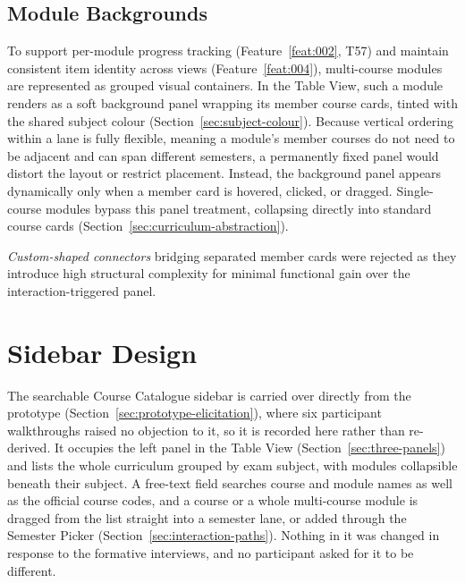 \subsection{Module Backgrounds}
\label{sec:modules-in-table}
To support per-module progress tracking (Feature~\ref{feat:002}, T57) and maintain consistent item identity across views (Feature~\ref{feat:004}), multi-course modules are represented as grouped visual containers. In the Table View, such a module renders as a soft background panel wrapping its member course cards, tinted with the shared subject colour (Section~\ref{sec:subject-colour}). Because vertical ordering within a lane is fully flexible, meaning a module's member courses do not need to be adjacent and can span different semesters, a permanently fixed panel would distort the layout or restrict placement. Instead, the background panel appears dynamically only when a member card is hovered, clicked, or dragged. Single-course modules bypass this panel treatment, collapsing directly into standard course cards (Section~\ref{sec:curriculum-abstraction}).

\emph{Custom-shaped connectors} bridging separated member cards were rejected as they introduce high structural complexity for minimal functional gain over the interaction-triggered panel.

\section{Sidebar Design}
\label{sec:sidebar-design}
The searchable Course Catalogue sidebar is carried over directly from the prototype (Section~\ref{sec:prototype-elicitation}), where six participant walkthroughs raised no objection to it, so it is recorded here rather than re-derived. It occupies the left panel in the Table View (Section~\ref{sec:three-panels}) and lists the whole curriculum grouped by exam subject, with modules collapsible beneath their subject. A free-text field searches course and module names as well as the official course codes, and a course or a whole multi-course module is dragged from the list straight into a semester lane, or added through the Semester Picker (Section~\ref{sec:interaction-paths}). Nothing in it was changed in response to the formative interviews, and no participant asked for it to be different.

